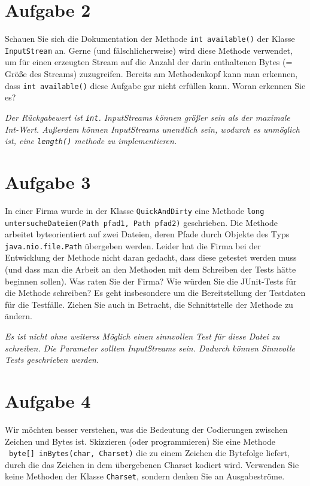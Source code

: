 \section{Aufgabe 2}

Schauen Sie sich die Dokumentation der Methode
\lstinline{int available()} der Klasse \lstinline{InputStream} an. Gerne (und
fälschlicherweise) wird diese Methode verwendet, um für einen erzeugten Stream
auf die Anzahl der darin enthaltenen Bytes (= Größe des Streams) zuzugreifen.
Bereits am Methodenkopf kann man erkennen, dass \lstinline{int available()}
diese Aufgabe gar nicht erfüllen kann. Woran erkennen Sie es?

\textit{Der Rückgabewert ist \lstinline{int}. InputStreams können größer sein als der maximale Int-Wert. Außerdem können InputStreams unendlich sein, wodurch es unmöglich ist, eine \lstinline{length()} methode zu implementieren.}

\section{Aufgabe 3}
In einer Firma wurde in der Klasse \lstinline{QuickAndDirty} eine Methode
\lstinline{long untersucheDateien(Path pfad1, Path pfad2)} geschrieben. Die
Methode arbeitet byteorientiert auf zwei Dateien, deren Pfade durch Objekte des
Typs \lstinline{java.nio.file.Path} übergeben werden. Leider hat die Firma bei
der Entwicklung der Methode nicht daran gedacht, dass diese getestet werden
muss (und dass man die Arbeit an den Methoden mit dem Schreiben der Tests hätte
beginnen sollen). Was raten Sie der Firma? Wie würden Sie die JUnit-Tests für
die Methode schreiben? Es geht insbesondere um die Bereitstellung der Testdaten
für die Testfälle. Ziehen Sie auch in Betracht, die Schnittstelle der Methode
zu ändern.

\textit{Es ist nicht ohne weiteres Möglich einen sinnvollen Test für diese Datei zu schreiben. Die Parameter sollten InputStreams sein. Dadurch können Sinnvolle Tests geschrieben werden.}

\pagebreak

\section{Aufgabe 4}
Wir möchten besser verstehen, was die Bedeutung der Codierungen zwischen
Zeichen und Bytes ist. Skizzieren (oder programmieren) Sie eine Methode \
\lstinline{byte[] inBytes(char, Charset)} die zu einem Zeichen die Bytefolge
liefert, durch die das Zeichen in dem übergebenen Charset kodiert wird.
Verwenden Sie keine Methoden der Klasse \lstinline{Charset}, sondern denken Sie
an Ausgabeströme.


